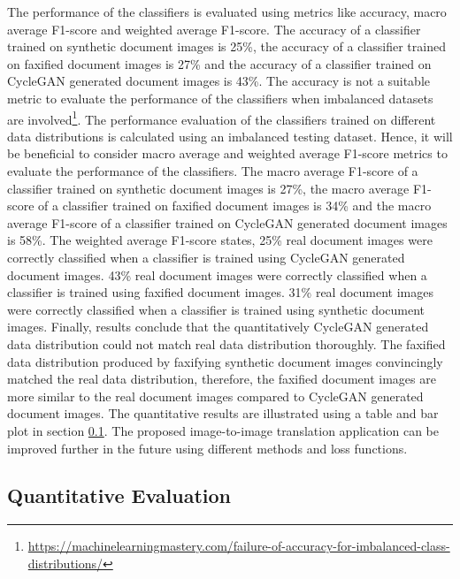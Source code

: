 The performance of the classifiers is evaluated using metrics like accuracy, macro average F1-score and weighted average F1-score. The accuracy of a classifier trained on synthetic document images is 25\%, the accuracy of a classifier trained on faxified document images is 27\% and the accuracy of a classifier trained on \ac{CycleGAN} generated document images is 43\%. The accuracy is not a suitable metric to evaluate the performance of the classifiers when imbalanced datasets are involved\footnote{\url{https://machinelearningmastery.com/failure-of-accuracy-for-imbalanced-class-distributions/} \dcdate}. The performance evaluation of the classifiers trained on different data distributions is calculated using an imbalanced testing dataset. Hence, it will be beneficial to consider macro average and weighted average F1-score metrics to evaluate the performance of the classifiers. The macro average F1-score of a classifier trained on synthetic document images is 27\%, the macro average F1-score of a classifier trained on faxified document images is 34\% and the macro average F1-score of a classifier trained on \ac{CycleGAN} generated document images is 58\%. The weighted average F1-score states, 25\% real document images were correctly classified when a classifier is trained using \ac{CycleGAN} generated document images. 43\% real document images were correctly classified when a classifier is trained using faxified document images. 31\% real document images were correctly classified when a classifier is trained using synthetic document images. Finally, results conclude that the quantitatively \ac{CycleGAN} generated data distribution could not match real data distribution thoroughly. The faxified data distribution produced by faxifying synthetic document images convincingly matched the real data distribution, therefore, the faxified document images are more similar to the real document images compared to \ac{CycleGAN} generated document images. The quantitative results are illustrated using a table and bar plot in section \ref{QuantitativeResults}. The proposed image-to-image translation application can be improved further in the future using different methods and loss functions.



\subsection{Quantitative Evaluation}\label{QuantitativeResults}



